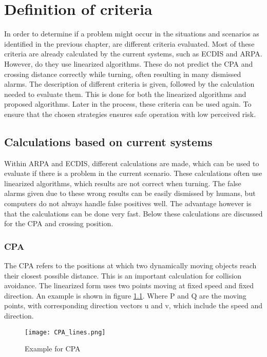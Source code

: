 \chapter{Definition of criteria}
\label{ch:criteria-problem}
In order to determine if a problem might occur in the situations and scenarios as identified in the previous chapter, are different criteria evaluated. Most of these criteria are already calculated by the current systems, such as \ac{ECDIS} and \ac{ARPA}. However, do they use linearized algorithms. These do not predict the \ac{CPA} and crossing distance correctly while turning, often resulting in many dismissed alarms. The description of different criteria is given, followed by the calculation needed to evaluate them. This is done for both the linearized algorithms and proposed algorithms. Later in the process, these criteria can be used again. To ensure that the chosen strategies ensures safe operation with low perceived risk.

\section{Calculations based on current systems}
\label{sec:linearized-methods}
Within \ac{ARPA} and \ac{ECDIS}, different calculations are made, which can be used to evaluate if there is a problem in the current scenario. These calculations often use linearized algorithms, which results are not correct when turning. The false alarms given due to these wrong results can be easily dismissed by humans, but computers do not always handle false positives well. The advantage however is that the calculations can be done very fast. Below these calculations are discussed for the \acf{CPA} and crossing position.

\subsection{\acf{CPA}}
The \ac{CPA} refers to the positions at which two dynamically moving objects reach their closest possible distance. This is an important calculation for collision avoidance. The linearized form uses two points moving at fixed speed and fixed direction. An example is shown in figure \ref{fig:CPA}. Where P and Q are the moving points, with corresponding direction vectors u and v, which include the speed and direction.

\begin{figure}[h]
	\centering
	\texttt{[image: CPA\_lines.png]}
	\caption{Example for \acf{CPA}}
	\label{fig:CPA}
\end{figure}

